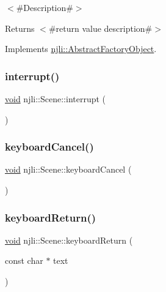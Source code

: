 $<$\#\+Description\#$>$

\begin{DoxyReturn}{Returns}
$<$\#return value description\#$>$ 
\end{DoxyReturn}


Implements \mbox{\hyperlink{classnjli_1_1_abstract_factory_object_a207c86146d40d0794708ae7f2d4e60a7}{njli\+::\+Abstract\+Factory\+Object}}.

\mbox{\label{classnjli_1_1_scene_ac567928cfa8c10e45a100792559d1d2b}} 
\subsubsection{\texorpdfstring{interrupt()}{interrupt()}}
{\footnotesize\ttfamily \mbox{\hyperlink{_thread_8h_af1e856da2e658414cb2456cb6f7ebc66}{void}} njli\+::\+Scene\+::interrupt (\begin{DoxyParamCaption}{ }\end{DoxyParamCaption})}

\mbox{\label{classnjli_1_1_scene_a2b864950aeb5d0b6687faa6b20840428}} 
\subsubsection{\texorpdfstring{keyboard\+Cancel()}{keyboardCancel()}}
{\footnotesize\ttfamily \mbox{\hyperlink{_thread_8h_af1e856da2e658414cb2456cb6f7ebc66}{void}} njli\+::\+Scene\+::keyboard\+Cancel (\begin{DoxyParamCaption}{ }\end{DoxyParamCaption})}

\mbox{\label{classnjli_1_1_scene_ad59791aaacc4de7aaed6925c7328838b}} 
\subsubsection{\texorpdfstring{keyboard\+Return()}{keyboardReturn()}}
{\footnotesize\ttfamily \mbox{\hyperlink{_thread_8h_af1e856da2e658414cb2456cb6f7ebc66}{void}} njli\+::\+Scene\+::keyboard\+Return (\begin{DoxyParamCaption}\item[{const char $\ast$}]{text }\end{DoxyParamCaption})}

